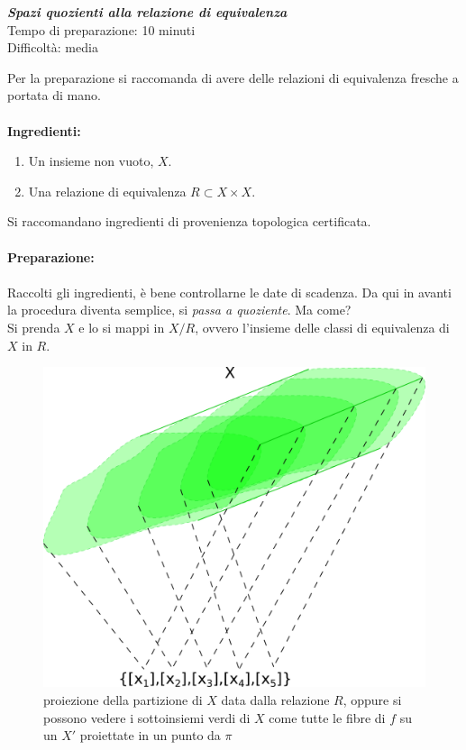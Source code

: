 \begin{flushright}
	{\selectfont
		\textit{\textcolor{TopGener}{\textbf{Spazi quozienti alla relazione di equivalenza}}}\\
		Tempo di preparazione: 10 minuti\\
		Difficoltà: media
	}
\end{flushright}

Per la preparazione si raccomanda di avere delle relazioni di equivalenza fresche a portata di mano. \\ \\
{\Large \textbf{Ingredienti:}} \\
\begin{enumerate}
	\item Un insieme non vuoto, $X$.
	\item Una relazione di equivalenza $R \subset X \times X$.
\end{enumerate}
Si raccomandano ingredienti di provenienza topologica certificata.
\\ \\ {\Large \textbf{Preparazione:}} \\ \\
Raccolti gli ingredienti, è bene controllarne le date di scadenza. Da qui in avanti la procedura diventa semplice, si \textit{passa a quoziente}. Ma come? \\ Si prenda $X$ e lo si mappi in $X / R$, ovvero l'insieme delle classi di equivalenza di $X$ in $R$. 

\begin{figure}[h]
	\centering
	\includegraphics[width=0.5\linewidth]{images/topologia_generale/projection_quotient}
	\caption{proiezione della partizione di $X$ data dalla relazione $R$, oppure si possono vedere i sottoinsiemi verdi di $X$ come tutte le fibre di $f$ su un $X'$ proiettate in un punto da $\pi$}
	\label{fig:projectionquotient}
\end{figure}

